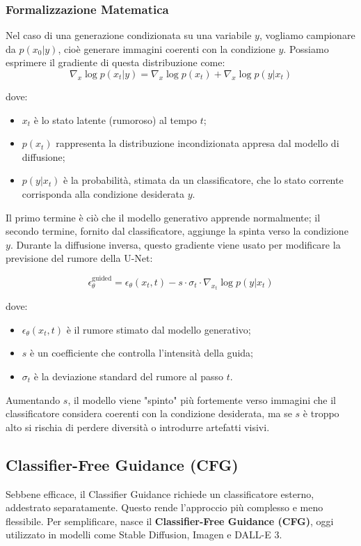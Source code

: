 \subsubsection{Formalizzazione Matematica}
Nel caso di una generazione condizionata su una variabile $y$, vogliamo campionare da $p(x_0 | y)$, cioè generare immagini coerenti con la condizione $y$. Possiamo esprimere il gradiente di questa distribuzione come:
\begin{equation}
    \nabla_x \log p(x_t|y) = \nabla_x \log p(x_t) + \nabla_x \log p(y|x_t)
\end{equation}

dove:
\begin{itemize}
    \item $x_t$ è lo stato latente (rumoroso) al tempo $t$;
    \item $p(x_t)$ rappresenta la distribuzione incondizionata appresa dal modello di diffusione;
    \item $p(y|x_t)$ è la probabilità, stimata da un classificatore, che lo stato corrente corrisponda alla condizione desiderata $y$.
\end{itemize}
Il primo termine è ciò che il modello generativo apprende normalmente; il secondo termine, fornito dal classificatore, aggiunge la spinta verso la condizione $y$. Durante la diffusione inversa, questo gradiente viene usato per modificare la previsione del rumore della U-Net:

\begin{equation}
    \epsilon_\theta^{\operatorname{guided}} = \epsilon_\theta(x_t,t) - s \cdot \sigma_t \cdot \nabla_{x_t}\log p(y|x_t)
\end{equation}

dove:
\begin{itemize}
    \item $\epsilon_\theta(x_t,t)$ è il rumore stimato dal modello generativo;
    \item $s$ è un coefficiente che controlla l’intensità della guida;
    \item $\sigma_t$ è la deviazione standard del rumore al passo $t$.
\end{itemize}

Aumentando $s$, il modello viene "spinto" più fortemente verso immagini che il classificatore considera coerenti con la condizione desiderata, ma se $s$ è troppo alto si rischia di perdere diversità o introdurre artefatti visivi.

\subsection{Classifier-Free Guidance (CFG)}
Sebbene efficace, il Classifier Guidance richiede un classificatore esterno, addestrato separatamente. Questo rende l’approccio più complesso e meno flessibile. Per semplificare, nasce il \textbf{Classifier-Free Guidance (CFG)}, oggi utilizzato in modelli come Stable Diffusion, Imagen e DALL-E 3.

